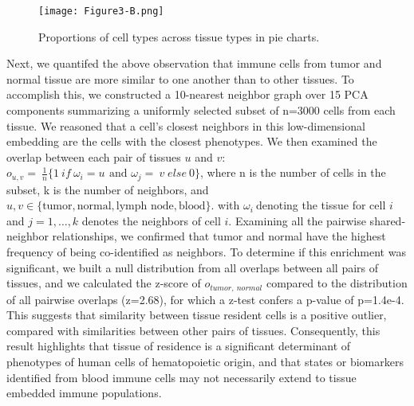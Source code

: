 \begin{figure}
\centering
\texttt{[image: Figure3-B.png]}
\caption{Proportions of cell types across tissue types in pie charts.}
\label{fig:3b}
\end{figure}

Next, we quantifed the above observation that immune cells from tumor and normal tissue are more similar to one another than to other tissues.
To accomplish this, we constructed a 10-nearest neighbor graph over 15 PCA components summarizing a uniformly selected subset of n=3000 cells from each tissue.
We reasoned that a cell's closest neighbors in this low-dimensional embedding are the cells with the closest phenotypes. 
We then examined the overlap between each pair of tissues $u$ and $v$: 
\(o_{u,v} = \ \frac{1}{n}\{ 1\ if\ {\omega_{i} = u}_{}\text{\ and\ }\omega_{j} = \ v_{}\ else\ 0\}\), where n is the number of cells in the subset, k is the number of neighbors, and $u, v \in \{\text{tumor}, \text{normal}, \text{lymph node}, \text{blood}\}$.
with \(\omega_{i}\ \)denoting the tissue for cell \(i\) and \(j = 1,\ldots,k\) denotes the neighbors of cell \(i\). 
Examining all the pairwise shared-neighbor relationships, we confirmed that tumor and normal have the highest frequency of being co-identified as neighbors. 
To determine if this enrichment was significant, we built a null distribution from all overlaps between all pairs of tissues, and we calculated the z-score of \(o_{tumor,\ normal}\) compared to the distribution of all pairwise overlaps (z=2.68), for which a z-test confers a p-value of p=1.4e-4.
This suggests that similarity between tissue resident cells is a positive outlier, compared with similarities between other pairs of tissues. 
Consequently, this result highlights that tissue of residence is a significant determinant of phenotypes of human cells of hematopoietic origin, and that states or biomarkers identified from blood immune cells may not necessarily extend to tissue embedded immune populations.

